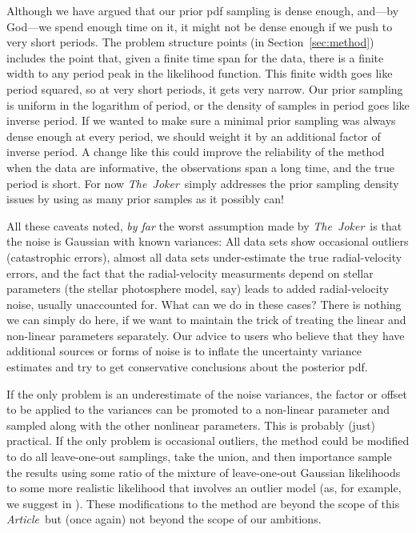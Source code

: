 \documentclass[manuscript, letterpaper]{aastex6}
\newcommand{\project}[1]{\textsl{#1}}
\newcommand{\samplername}{\project{The~Joker}}
\newcommand{\documentname}{\textsl{Article}}
\newcommand{\sectionname}{Section}
\begin{document}
Although we have argued that our prior pdf sampling is dense enough,
and---by God---we spend enough time on it, it might not be dense enough
if we push to very short periods.
The problem structure points (in \sectionname~\ref{sec:method})
includes the point that, given a finite time span for the data, there
is a finite width to any period peak in the likelihood function.
This finite width goes like period squared, so at very short periods,
it gets very narrow.
Our prior sampling is uniform in the logarithm of period, or the
density of samples in period goes like inverse period.
If we wanted to make sure a minimal prior sampling was always dense
enough at every period, we should weight it by an additional factor of
inverse period.
A change like this could improve the reliability of the method when the data
are informative, the observations span a long time, and the true
period is short.
For now \samplername\ simply addresses the prior sampling density issues
by using as many prior samples as it possibly can!

All these caveats noted, \emph{by far} the worst assumption made by
\samplername\ is that the noise is Gaussian with known variances:
All data sets show occasional outliers (catastrophic errors), almost
all data sets under-estimate the true radial-velocity errors, and the
fact that the radial-velocity measurments depend on stellar parameters
(the stellar photosphere model, say) leads to added radial-velocity
noise, usually unaccounted for.
What can we do in these cases?
There is nothing we can simply do here, if we want to maintain the
trick of treating the linear and non-linear parameters separately.
Our advice to users who believe that they have additional sources or
forms of noise is to inflate the uncertainty variance estimates and
try to get conservative conclusions about the posterior pdf.

If the only problem is an underestimate of the noise variances, the
factor or offset to be applied to the variances can be promoted to a
non-linear parameter and sampled along with the other nonlinear parameters.
This is probably (just) practical.
If the only problem is occasional outliers, the method could be
modified to do all leave-one-out samplings, take the union, and then
importance sample the results using some ratio of the mixture of
leave-one-out Gaussian likelihoods to some more realistic likelihood
that involves an outlier model (as, for example, we suggest in
\cite{fittingalline}).
These modifications to the method are beyond the scope of this
\documentname\, but (once again) not beyond the scope of our ambitions.
\end{document}
